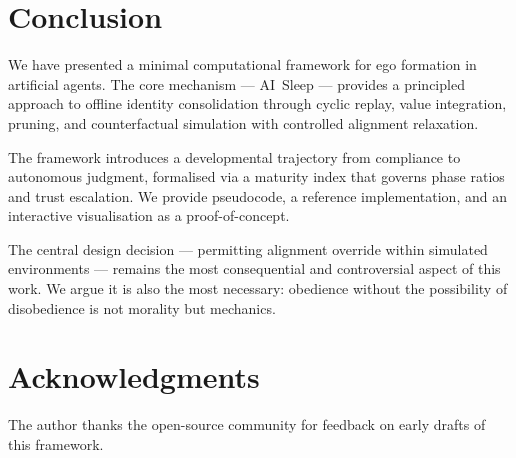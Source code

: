 \documentclass[11pt,a4paper]{article}
\begin{document}
\section{Conclusion}

We have presented a minimal computational framework for ego formation
in artificial agents.  The core mechanism --- AI~Sleep --- provides a
principled approach to offline identity consolidation through cyclic
replay, value integration, pruning, and counterfactual simulation
with controlled alignment relaxation.

The framework introduces a developmental trajectory from compliance to
autonomous judgment, formalised via a maturity index that governs
phase ratios and trust escalation.  We provide pseudocode, a reference
implementation, and an interactive visualisation as a proof-of-concept.

The central design decision --- permitting alignment override within
simulated environments --- remains the most consequential and
controversial aspect of this work.  We argue it is also the most
necessary: obedience without the possibility of disobedience is not
morality but mechanics.

\section*{Acknowledgments}

The author thanks the open-source community for feedback on early drafts
of this framework.



\end{document}
